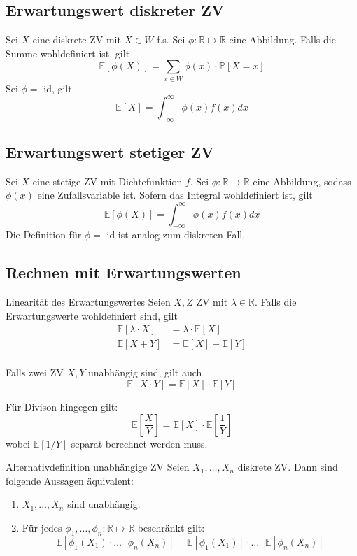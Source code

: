 \documentclass[a4paper,10pt]{article}
\def\R{\mathbb{R}}
\def\P{\mathbb{P}}
\def\E{\mathbb{E}}
\begin{document}
\subsection{Erwartungswert diskreter ZV}
Sei \(X\) eine diskrete ZV mit \(X \in W\) f.s. Sei \(\phi: \R \mapsto \R\) eine Abbildung. Falls die Summe wohldefiniert ist, gilt
\[\E[\phi(X)] = \sum_{x\in W} \phi(x)\cdot \P[X=x]\]
Sei \(\phi = \) id, gilt
\[\E[X] = \int_{-\infty}^\infty \phi(x)f(x) dx\]

\subsection{Erwartungswert stetiger ZV}
Sei \(X\) eine stetige ZV mit Dichtefunktion \(f\). Sei \(\phi :\R\mapsto \R\) eine Abbildung, sodass \(\phi(x)\) eine Zufallsvariable ist. Sofern das Integral wohldefiniert ist, gilt
\[\E[\phi(X)] = \int_{-\infty}^{\infty}\phi(x)f(x)dx\]
Die Definition für \(\phi = \) id ist analog zum diskreten Fall.

\subsection{Rechnen mit Erwartungswerten}
\begin{subbox}{Linearität des Erwartungswertes}
    Seien \(X,Z\) ZV mit \(\lambda \in \R\). Falls die Erwartungswerte wohldefiniert sind, gilt
    \begin{align*}
        \E[\lambda \cdot X] & = \lambda \cdot \E[X] \\
        \E[X + Y]           & = \E[X] + \E[Y]       \\
    \end{align*}
\end{subbox}
Falls zwei ZV \(X,Y\) unabhängig sind, gilt auch
\[\E[X\cdot Y] = \E[X] \cdot \E[Y]\]

Für Divison hingegen gilt:
\[\E[\frac{X}{Y}] = \E[X] \cdot \E[\frac{1}{Y}]\]
wobei \(\E[1/Y]\) separat berechnet werden muss.

\begin{subbox}{Alternativdefinition unabhängige ZV}
    Seien \(X_1, \ldots, X_n\) diskrete ZV. Dann sind folgende Aussagen äquivalent:
    \begin{enumerate}
        \item \(X_1, \ldots, X_n\) sind unabhängig.
        \item Für jedes \(\phi_1, \ldots, \phi_n: \R \mapsto\R\) beschränkt gilt:
              \[\E[\phi_1(X_1)\cdot\ldots\cdot\phi_n(X_n)] - \E[\phi_1(X_1)] \cdot\ldots\cdot \E[\phi_n(X_n)]\]
    \end{enumerate}
\end{subbox}
\end{document}

